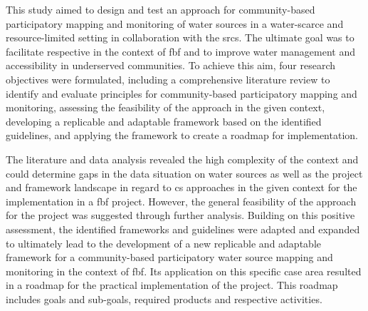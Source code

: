 



This study aimed to design and test an approach for community-based participatory mapping and monitoring of water sources in a water-scarce and resource-limited setting in collaboration with the \acrlong{srcs}. The ultimate goal was to facilitate respective  in the context of \acrlong{fbf} and to improve water management and accessibility in underserved communities. To achieve this aim, four research objectives were formulated, including a comprehensive literature review to identify and evaluate principles for community-based participatory mapping and monitoring, assessing the feasibility of the approach in the given context, developing a replicable and adaptable framework based on the identified guidelines, and applying the framework to create a roadmap for implementation.\newline

The literature and data analysis revealed the high complexity of the context and could determine gaps in the data situation on water sources as well as the project and framework landscape in regard to \acrlong{cs} approaches in the given context for the implementation in a \acrshort{fbf} project. However, the general feasibility of the approach for the project was suggested through further analysis. Building on this positive assessment, the identified frameworks and guidelines were adapted and expanded to ultimately lead to the development of a new replicable and adaptable framework for a community-based participatory water source mapping and monitoring in the context of \acrlong{fbf}. Its application on this specific case area resulted in a roadmap for the practical implementation of the project. This roadmap includes goals and sub-goals, required products and respective activities.\newline

